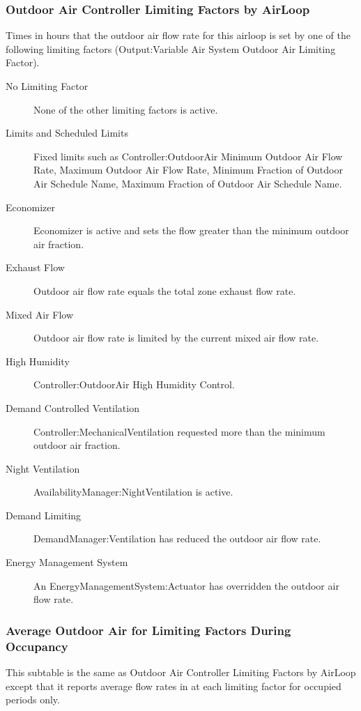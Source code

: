 \subsubsection{Outdoor Air Controller Limiting Factors by AirLoop}\label{outdoor-air-controller-limiting-factors-by-airloop}
  Times in hours that the outdoor air flow rate for this airloop is set by one of the following limiting factors (Output:Variable Air System Outdoor Air Limiting Factor).
\begin{description}
  \item[No Limiting Factor] None of the other limiting factors is active.
  \item[Limits and Scheduled Limits] Fixed limits such as Controller:OutdoorAir Minimum Outdoor Air Flow Rate, Maximum Outdoor Air Flow Rate, Minimum Fraction of Outdoor Air Schedule Name, Maximum Fraction of Outdoor Air Schedule Name.
  \item[Economizer] Economizer is active and sets the flow greater than the minimum outdoor air fraction.
  \item[Exhaust Flow] Outdoor air flow rate equals the total zone exhaust flow rate.
  \item[Mixed Air Flow] Outdoor air flow rate is limited by the current mixed air flow rate.
  \item[High Humidity] Controller:OutdoorAir High Humidity Control.
  \item[Demand Controlled Ventilation] Controller:MechanicalVentilation requested more than the minimum outdoor air fraction.
  \item[Night Ventilation] AvailabilityManager:NightVentilation is active.
  \item[Demand Limiting] DemandManager:Ventilation has reduced the outdoor air flow rate.
  \item[Energy Management System] An EnergyManagementSystem:Actuator has overridden the outdoor air flow rate.
\end{description}

\subsubsection{Average Outdoor Air for Limiting Factors During Occupancy}\label{average-outdoor-air-for-limiting-factors-during-occupancy}
This subtable is the same as Outdoor Air Controller Limiting Factors by AirLoop except that it reports average flow rates in \si{\volumeFlowRate} at each limiting factor for occupied periods only.


